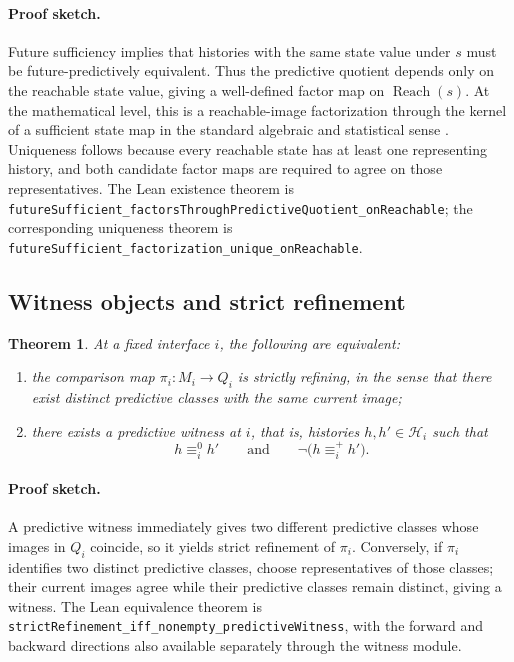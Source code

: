 \documentclass[11pt]{article}
\newcommand{\CurrentQ}{Q}
\newcommand{\PredictiveQ}{M}
\newcommand{\Histories}{\mathcal{H}}
\newcommand{\CurrentEquiv}{\equiv^{0}}
\newcommand{\FutureEquiv}{\equiv^{+}}
\newtheorem{theorem}{Theorem}[section]
\theoremstyle{definition}
\begin{document}
\paragraph{Proof sketch.}
Future sufficiency implies that histories with the same state value under $s$ must be future-predictively equivalent. Thus the predictive quotient depends only on the reachable state value, giving a well-defined factor map on $\operatorname{Reach}(s)$. At the mathematical level, this is a reachable-image factorization through the kernel of a sufficient state map in the standard algebraic and statistical sense \citep{BurrisSankappanavar1981CourseUniversalAlgebra,LehmannCasella1998TheoryPointEstimation}. Uniqueness follows because every reachable state has at least one representing history, and both candidate factor maps are required to agree on those representatives. The Lean existence theorem is \texttt{futureSufficient\_factorsThroughPredictiveQuotient\_onReachable}; the corresponding uniqueness theorem is \texttt{futureSufficient\_factorization\_unique\_onReachable}.

\subsection{Witness objects and strict refinement}\label{subsec:thm-witnesses}
\begin{theorem}\label{thm:witness-strict-refinement}
At a fixed interface $i$, the following are equivalent:
\begin{enumerate}
\item the comparison map $\pi_i : \PredictiveQ_i \to \CurrentQ_i$ is strictly refining, in the sense that there exist distinct predictive classes with the same current image;
\item there exists a predictive witness at $i$, that is, histories $h,h'\in\Histories_i$ such that
\[
h \CurrentEquiv_i h'
\qquad\text{and}\qquad
\neg\bigl(h \FutureEquiv_i h'\bigr).
\]
\end{enumerate}
\end{theorem}

\paragraph{Proof sketch.}
A predictive witness immediately gives two different predictive classes whose images in $\CurrentQ_i$ coincide, so it yields strict refinement of $\pi_i$. Conversely, if $\pi_i$ identifies two distinct predictive classes, choose representatives of those classes; their current images agree while their predictive classes remain distinct, giving a witness. The Lean equivalence theorem is \texttt{strictRefinement\_iff\_nonempty\_predictiveWitness}, with the forward and backward directions also available separately through the witness module.
\end{document}
